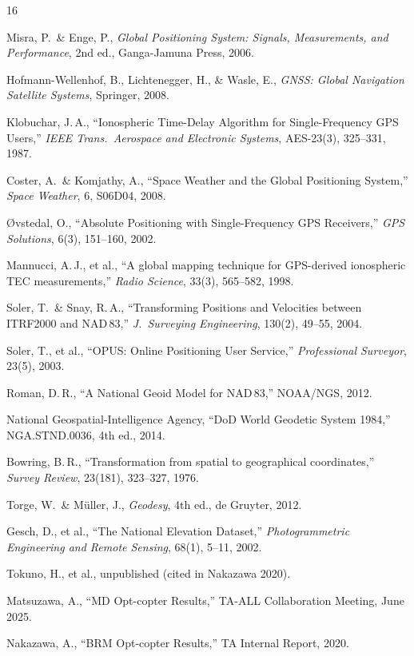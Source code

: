 \begin{thebibliography}{16}

Misra, P.\ \& Enge, P.,
\textit{Global Positioning System: Signals, Measurements, and Performance},
2nd ed., Ganga-Jamuna Press, 2006.

Hofmann-Wellenhof, B., Lichtenegger, H., \& Wasle, E.,
\textit{GNSS: Global Navigation Satellite Systems},
Springer, 2008.

Klobuchar, J.\,A.,
``Ionospheric Time-Delay Algorithm for Single-Frequency GPS Users,''
\textit{IEEE Trans.\ Aerospace and Electronic Systems}, AES-23(3), 325--331, 1987.

Coster, A.\ \& Komjathy, A.,
``Space Weather and the Global Positioning System,''
\textit{Space Weather}, 6, S06D04, 2008.

{\O}vstedal, O.,
``Absolute Positioning with Single-Frequency GPS Receivers,''
\textit{GPS Solutions}, 6(3), 151--160, 2002.

Mannucci, A.\,J., et al.,
``A global mapping technique for GPS-derived ionospheric TEC measurements,''
\textit{Radio Science}, 33(3), 565--582, 1998.

Soler, T.\ \& Snay, R.\,A.,
``Transforming Positions and Velocities between ITRF2000 and NAD\,83,''
\textit{J.\ Surveying Engineering}, 130(2), 49--55, 2004.

Soler, T., et al.,
``OPUS: Online Positioning User Service,''
\textit{Professional Surveyor}, 23(5), 2003.

Roman, D.\,R.,
``A National Geoid Model for NAD\,83,''
NOAA/NGS, 2012.

National Geospatial-Intelligence Agency,
``DoD World Geodetic System 1984,''
NGA.STND.0036, 4th ed., 2014.

Bowring, B.\,R.,
``Transformation from spatial to geographical coordinates,''
\textit{Survey Review}, 23(181), 323--327, 1976.

Torge, W.\ \& M{\"u}ller, J.,
\textit{Geodesy}, 4th ed., de Gruyter, 2012.

Gesch, D., et al.,
``The National Elevation Dataset,''
\textit{Photogrammetric Engineering and Remote Sensing}, 68(1), 5--11, 2002.

Tokuno, H., et al.,
unpublished (cited in Nakazawa 2020).

Matsuzawa, A.,
``MD Opt-copter Results,''
TA-ALL Collaboration Meeting, June 2025.

Nakazawa, A.,
``BRM Opt-copter Results,''
TA Internal Report, 2020.

\end{thebibliography}
